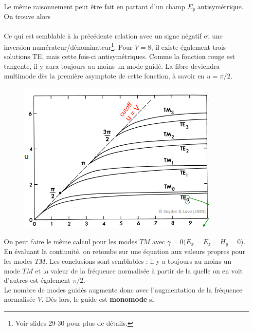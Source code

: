 Le même raisonnement peut être fait en partant d'un champ $E_y$ antisymétrique. On trouve alors\ \\

\ \\

Ce qui est semblable à la précédente relation avec un signe négatif et une inversion 
numérateur/dénominateur\footnote{Voir slides 29-30 pour plus de détails.}. Pour $V=8$, il existe
également trois solutions TE, mais cette fois-ci antisymétriques. Comme la fonction rouge est 
tangente, il y aura toujours au moins un mode guidé. La fibre deviendra multimode dès la première
asymptote de cette fonction, à savoir en $u=\pi/2$.

\newpage
\begin{figure}
	\vspace{-2mm}
	\includegraphics[scale=0.65]{ch1/image15}
	\end{figure}
On peut faire le même calcul pour les modes $TM$ avec $\gamma=0 (E_x=E_z=H_y=0$). En évaluant la 
continuité, on retombe sur une équation aux valeurs propres pour les modes $TM$. Les conclusions
sont semblables : il y a toujours au moins un mode $TM$ et la valeur de la fréquence normalisée
à partir de la quelle on en voit d'autres est également $\pi/2$. \\

Le nombre de modes guidés augmente donc avec l'augmentation de la fréquence normalisée $V$. Dès 
lors, le guide est \textbf{monomode} si\\

